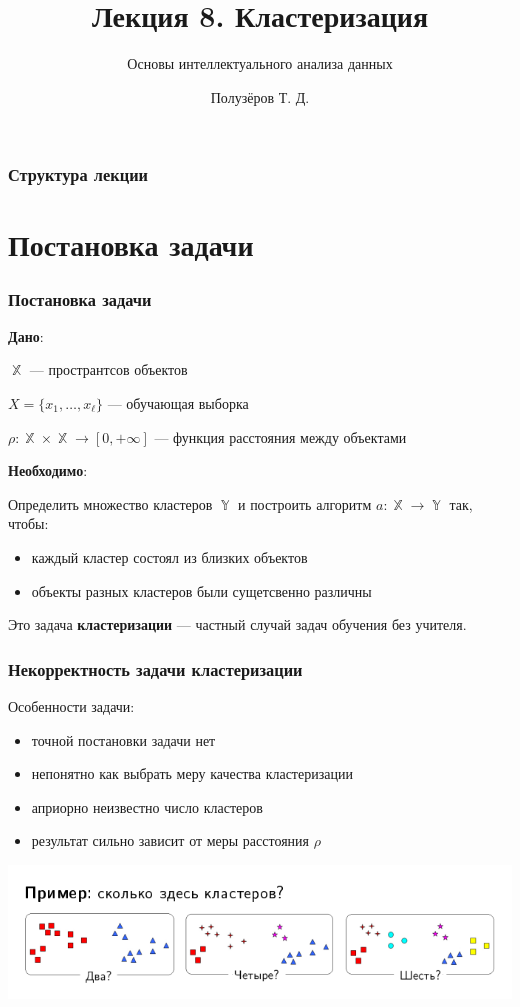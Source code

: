 \documentclass{beamer}
\title[Кластеризация]{Лекция 8. Кластеризация}
\subtitle{Основы интеллектуального анализа данных}
\author{Полузёров Т. Д.}
\institute{БГУ ФПМИ}
\date{}
\DeclareMathOperator{\X}{\mathbb{X}}
\DeclareMathOperator{\Y}{\mathbb{Y}}
\begin{document}
	
	\begin{frame}
		\titlepage
	\end{frame}
	
	
	\begin{center}
		\frametitle{Структура лекции}
		\tableofcontents
	\end{center}
	
	\section{Постановка задачи}

	\begin{frame}
        \frametitle{Постановка задачи}

		\textbf{Дано}:

		$\X$ --- пространтсов объектов

		$X = \{x_1, \dots, x_{\ell}\}$ --- обучающая выборка

		$\rho : \X \times \X \rightarrow [0, +\infty]$ --- функция расстояния между объектами

		\vspace{15pt}

		\textbf{Необходимо}:

		Определить множество кластеров $\Y$ и построить алгоритм $a : \X \rightarrow \Y$
		так, чтобы:

		\begin{itemize}
			\item каждый кластер состоял из близких объектов
			\item объекты разных кластеров были сущетсвенно различны
		\end{itemize}

		\vspace{15pt}

		Это задача \textbf{кластеризации} --- частный случай задач обучения без учителя.
    \end{frame}

    
	\begin{frame}
		\frametitle{Некорректность задачи кластеризации}
		Особенности задачи:
		\begin{itemize}
			\item точной постановки задачи нет
			\item непонятно как выбрать меру качества кластеризации
			\item априорно неизвестно число кластеров
			\item результат сильно зависит от меры расстояния $\rho$
		\end{itemize}

		\includegraphics[width=1\textwidth]{img/unk_num_clusters.png}
	\end{frame}
\end{document}
